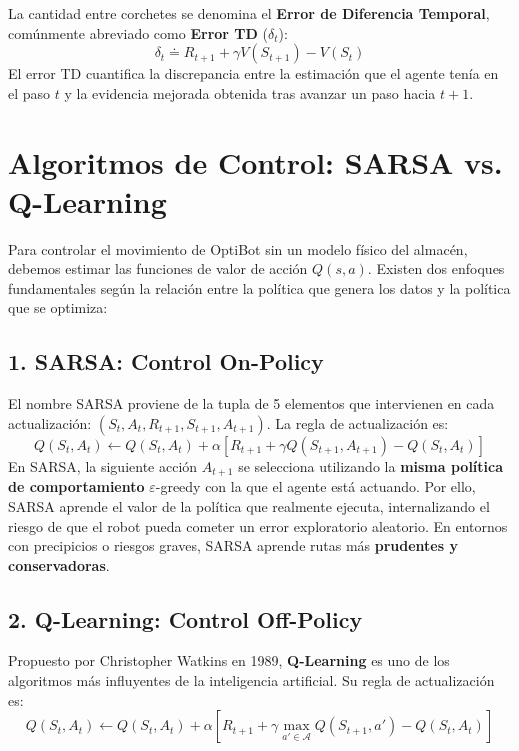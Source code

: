 La cantidad entre corchetes se denomina el \textbf{Error de Diferencia Temporal}, comúnmente abreviado como \textbf{Error TD} ($\delta_t$):
\begin{equation}
  \delta_t \doteq R_{t+1} + \gamma V(S_{t+1}) - V(S_t)
\end{equation}
El error TD cuantifica la discrepancia entre la estimación que el agente tenía en el paso $t$ y la evidencia mejorada obtenida tras avanzar un paso hacia $t+1$.

\section{Algoritmos de Control: SARSA vs. Q-Learning}
Para controlar el movimiento de OptiBot sin un modelo físico del almacén, debemos estimar las funciones de valor de acción $Q(s, a)$. Existen dos enfoques fundamentales según la relación entre la política que genera los datos y la política que se optimiza:

\subsection{1. SARSA: Control On-Policy}
El nombre SARSA proviene de la tupla de 5 elementos que intervienen en cada actualización: $(S_t, A_t, R_{t+1}, S_{t+1}, A_{t+1})$. La regla de actualización es:
\begin{equation}
  Q(S_t, A_t) \leftarrow Q(S_t, A_t) + \alpha \left[ R_{t+1} + \gamma Q(S_{t+1}, A_{t+1}) - Q(S_t, A_t) \right]
\end{equation}
En SARSA, la siguiente acción $A_{t+1}$ se selecciona utilizando la \textbf{misma política de comportamiento} $\varepsilon$-greedy con la que el agente está actuando. Por ello, SARSA aprende el valor de la política que realmente ejecuta, internalizando el riesgo de que el robot pueda cometer un error exploratorio aleatorio. En entornos con precipicios o riesgos graves, SARSA aprende rutas más \textbf{prudentes y conservadoras}.

\subsection{2. Q-Learning: Control Off-Policy}
Propuesto por Christopher Watkins en 1989, \textbf{Q-Learning} es uno de los algoritmos más influyentes de la inteligencia artificial. Su regla de actualización es:
\begin{equation}
  Q(S_t, A_t) \leftarrow Q(S_t, A_t) + \alpha \left[ R_{t+1} + \gamma \max_{a' \in \mathcal{A}} Q(S_{t+1}, a') - Q(S_t, A_t) \right]
\end{equation}


